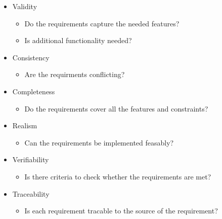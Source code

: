 \documentclass[
../../Software_Engineering_Summary.tex,
]
{subfiles}
\begin{document}
\begin{defbox}
    \begin{itemize}
        \item Validity
        \begin{itemize}
            \item Do the requirements capture the needed features?
            \item Is additional functionality needed?
        \end{itemize}
        \item Consistency
        \begin{itemize}
            \item Are the requirments conflicting?
        \end{itemize}
        \item Completeness
        \begin{itemize}
            \item Do the requirements cover all the features and constraints?
        \end{itemize}
        \item Realism
        \begin{itemize}
            \item Can the requirements be implemented feasably?
        \end{itemize}
        \item Verifiability
        \begin{itemize}
            \item Is there criteria to check whether the requirements are met?
        \end{itemize}
        \item Traceability
        \begin{itemize}
            \item Is each requirement tracable to the source of the requirement?
        \end{itemize}
    \end{itemize}
\end{defbox}
\end{document}
